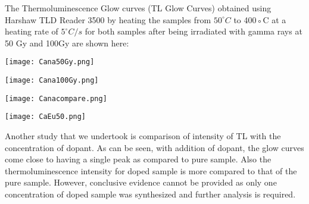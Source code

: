 \documentclass[../result.tex]{subfiles}
\begin{document}
    The Thermoluminescence Glow curves (TL Glow Curves) obtained using Harshaw TLD Reader 3500 by heating
    the samples from $50^{\circ}C$ to 400◦C at a heating rate of $5^{\circ}C/s$ for both samples after being irradiated with gamma
    rays at 50 Gy and 100Gy are shown here:

    \FloatBarrier\begin{multicols}{2}
        \begin{Figure}
            \centering
            \texttt{[image: Cana50Gy.png]}
            \label{fig:Cana50Gy}
        \end{Figure}
        \begin{Figure}
            \centering
            \texttt{[image: Cana100Gy.png]}
            \label{fig:Cana100Gy}
        \end{Figure}
        \begin{Figure}
            \centering
            \texttt{[image: Canacompare.png]}
            \label{fig:Canacompare}
        \end{Figure}
        \begin{Figure}
            \centering
            \texttt{[image: CaEu50.png]}
            \label{fig:CaEu50}
        \end{Figure}
    \end{multicols}

    Another study that we undertook is comparison of intensity of TL with the concentration of dopant. As
    can be seen, with addition of dopant, the glow curves come close to having a single peak as compared to pure
    sample. Also the thermoluminescence intensity for doped sample is more compared to that of the pure sample.
    However, conclusive evidence cannot be provided as only one concentration of doped sample was synthesized
    and further analysis is required.
\end{document}
